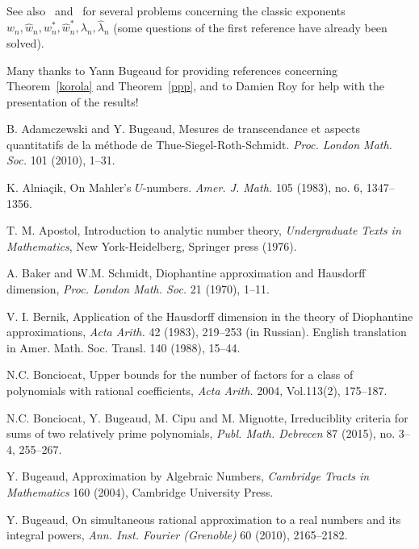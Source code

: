 \documentclass[12pt]{amsart}
\theoremstyle{definition}
\begin{document}
See also~\cite[Section~10.2]{bugbuch} and~\cite{bdraft} for
several problems concerning the classic exponents $w_{n}, \widehat{w}_{n}, w_{n}^{\ast}, \widehat{w}_{n}^{\ast}, \lambda_{n}, \widehat{\lambda}_{n}$
(some questions of the first reference have already been solved).


\vspace{0.5cm}

Many 
thanks to Yann Bugeaud for providing references concerning Theorem~\ref{korola} and Theorem~\ref{ppp},
and to Damien Roy for help with the presentation of the results!


\begin{thebibliography}{99}

 B. Adamczewski and Y. Bugeaud,  Mesures de transcendance et aspects quantitatifs de la m\'{e}thode de Thue-Siegel-Roth-Schmidt.
{\em Proc. London Math. Soc.} 101 (2010), 1--31.

 K. Alnia\c{c}ik, On Mahler's $U$-numbers. {\em Amer. J. Math.} 105 (1983), no. 6, 1347--1356. 

 T. M. Apostol, Introduction to analytic number theory, {\em Undergraduate Texts in Mathematics}, 
New York-Heidelberg, Springer press (1976).

 A. Baker and W.M. Schmidt, Diophantine approximation and Hausdorff dimension,
{\em Proc. London Math. Soc.} 21 (1970), 1--11.





 V. I. Bernik, Application of the Hausdorff dimension in the theory of Diophantine approximations,
{\em Acta Arith.} 42 (1983), 219--253 (in Russian). English translation in Amer. Math. Soc. Transl. 140 (1988), 15--44.

 N.C. Bonciocat,
Upper bounds for the number of factors for a class of polynomials with rational coefficients, {\em Acta Arith.} 2004, Vol.113(2), 175--187.

 N.C. Bonciocat, Y. Bugeaud, M. Cipu and M. Mignotte,
Irreduciblity criteria for sums of two relatively prime polynomials,
{\em Publ. Math. Debrecen} 87 (2015), no. 3--4, 255--267. 

 Y. Bugeaud, Approximation by Algebraic Numbers,
{\em Cambridge Tracts in Mathematics} 160 (2004), Cambridge University Press.

 Y. Bugeaud, On simultaneous rational approximation to a real numbers and its integral powers, 
{\em Ann. Inst. Fourier (Grenoble)} 60 (2010), 2165--2182.   


\end{thebibliography}
\end{document}
